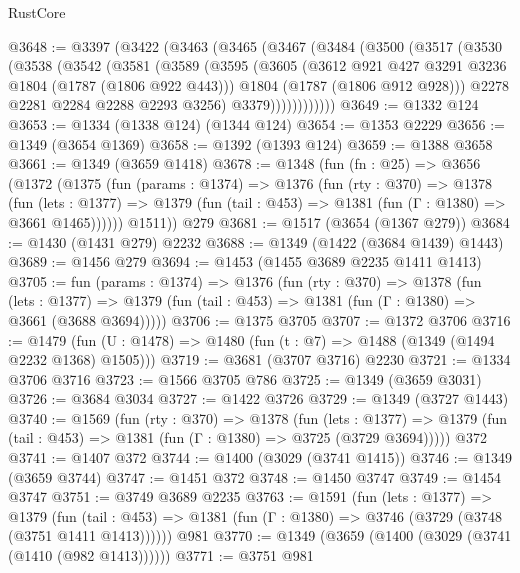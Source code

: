 \begin{lexlean}{RustCore}
\begin{coremodule}
@3648 := @3397
    (@3422
      (@3463
        (@3465
          (@3467
            (@3484
              (@3500
                (@3517
                  (@3530
                    (@3538
                      (@3542
                        (@3581
                          (@3589
                            (@3595
                              (@3605
                                (@3612 @921 @427 @3291 @3236 @1804 (@1787 (@1806 @922 @443)))
                                @1804
                                (@1787 (@1806 @912 @928)))
                              @2278
                              @2281
                              @2284
                              @2288
                              @2293
                              @3256)
                            @3379))))))))))))
@3649 := @1332 @124
@3653 := @1334 (@1338 @124) (@1344 @124)
@3654 := @1353 @2229
@3656 := @1349 (@3654 @1369)
@3658 := @1392 (@1393 @124)
@3659 := @1388 @3658
@3661 := @1349 (@3659 @1418)
@3678 := @1348
    (fun (fn : @25) =>
    @3656
      (@1372
        (@1375
          (fun (params : @1374) =>
          @1376
            (fun (rty : @370) =>
            @1378
              (fun (lets : @1377) =>
              @1379 (fun (tail : @453) => @1381 (fun (Γ : @1380) => @3661 @1465))))))
        @1511))
    @279
@3681 := @1517 (@3654 (@1367 @279))
@3684 := @1430 (@1431 @279) @2232
@3688 := @1349 (@1422 (@3684 @1439) @1443)
@3689 := @1456 @279
@3694 := @1453 (@1455 @3689 @2235 @1411 @1413)
@3705 := fun (params : @1374) =>
  @1376
    (fun (rty : @370) =>
    @1378
      (fun (lets : @1377) =>
      @1379 (fun (tail : @453) => @1381 (fun (Γ : @1380) => @3661 (@3688 @3694)))))
@3706 := @1375 @3705
@3707 := @1372 @3706
@3716 := @1479 (fun (U : @1478) => @1480 (fun (t : @7) => @1488 (@1349 (@1494 @2232 @1368) @1505)))
@3719 := @3681 (@3707 @3716) @2230
@3721 := @1334 @3706 @3716
@3723 := @1566 @3705 @786
@3725 := @1349 (@3659 @3031)
@3726 := @3684 @3034
@3727 := @1422 @3726
@3729 := @1349 (@3727 @1443)
@3740 := @1569
    (fun (rty : @370) =>
    @1378
      (fun (lets : @1377) =>
      @1379 (fun (tail : @453) => @1381 (fun (Γ : @1380) => @3725 (@3729 @3694)))))
    @372
@3741 := @1407 @372
@3744 := @1400 (@3029 (@3741 @1415))
@3746 := @1349 (@3659 @3744)
@3747 := @1451 @372
@3748 := @1450 @3747
@3749 := @1454 @3747
@3751 := @3749 @3689 @2235
@3763 := @1591
    (fun (lets : @1377) =>
    @1379
      (fun (tail : @453) => @1381 (fun (Γ : @1380) => @3746 (@3729 (@3748 (@3751 @1411 @1413))))))
    @981
@3770 := @1349 (@3659 (@1400 (@3029 (@3741 (@1410 (@982 @1413))))))
@3771 := @3751 @981

\end{coremodule}
\end{lexlean}
